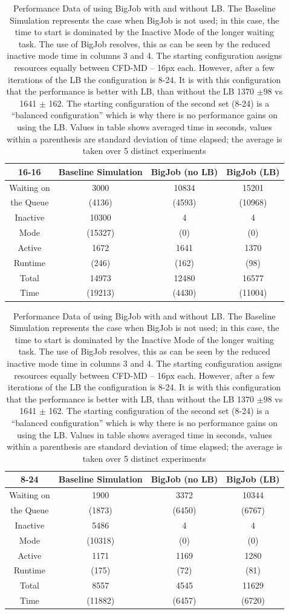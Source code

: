 \documentclass[conference,final]{IEEEtran}
\begin{document}
\begin{table}[!h]
\begin{center}
\label{table:oneBJ_Test}
\caption{\small Performance Data of using BigJob with and without LB. The Baseline 
Simulation represents the case when BigJob is not used; in this case, the time to start 
is dominated by the Inactive Mode of the longer waiting task. The use of BigJob resolves, 
this as can be seen by the reduced inactive mode time in columns
3 and 4. The starting configuration assigns resources equally between CFD-MD -- 16px 
each. However, after a few iterations of the LB the configuration is 8-24. It is with 
this configuration that the performance is better with LB, than without the LB 1370 $\pm 
98$ vs 1641 $\pm$ 162. The starting configuration of the second set (8-24) is a 
``balanced configuration'' which is why there is no performance gains on using the LB. 
Values in table shows averaged time in seconds, values within a parenthesis are standard 
deviation of time elapsed; the average is taken over 5 distinct experiments}
\begin{tabular}{ c|| c | c | c }
\hline
16-16 & Baseline Simulation & BigJob (no LB) & BigJob (LB) \\
\hline
\hline
Waiting on & 3000 & 10834 & 15201 \\
the Queue & (4136) & (4593) & (10968) \\
\hline
Inactive & 10300 & 4 & 4 \\
Mode & (15327) & (0) & (0) \\
\hline
Active & 1672 & 1641 & 1370 \\
Runtime & (246) & (162) & (98) \\
\hline
Total & 14973 & 12480 & 16577 \\
Time & (19213) & (4430) & (11004) \\
\hline
\end{tabular}
\begin{tabular}{ c|| c | c | c }
\hline
8-24 & Baseline Simulation & BigJob (no LB) & BigJob (LB) \\
\hline
\hline
Waiting on & 1900 & 3372 & 10344 \\
the Queue & (1873) & (6450) & (6767) \\
\hline
Inactive & 5486 & 4 & 4 \\
Mode & (10318) & (0) & (0) \\
\hline
Active & 1171 & 1169 & 1280 \\
Runtime & (175) & (72) & (81) \\
\hline
Total & 8557 & 4545 & 11629 \\
Time & (11882) & (6457) & (6720) \\
\hline
\end{tabular}
\end{center}
\end{table}
\end{document}
